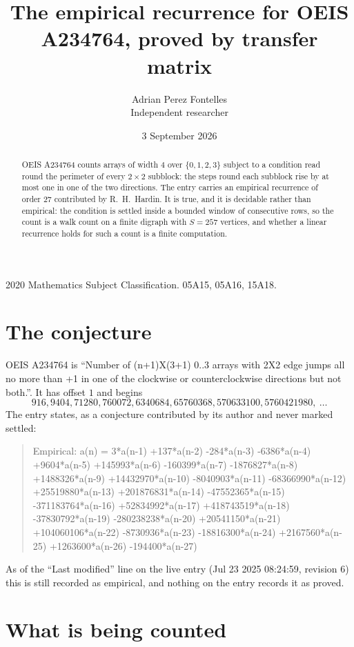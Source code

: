 \documentclass[11pt,a4paper]{article}
\title{The empirical recurrence for OEIS A234764, proved by transfer matrix}
\author{Adrian Perez Fontelles\\ \small Independent researcher}
\date{3 September 2026}
\theoremstyle{plain}
\theoremstyle{definition}
\begin{document}
\maketitle

\begin{abstract}
OEIS A234764 counts arrays of width $4$ over $\{0,1,2,3\}$ subject to a condition read round the
perimeter of every $2\times2$ subblock: the steps round each subblock rise by at most one in one of the two directions. The entry carries an empirical recurrence of
order $27$ contributed by R.~H.~Hardin. It is true, and it is decidable rather than
empirical: the condition is settled inside a bounded window of consecutive rows, so the
count is a walk count on a finite digraph with $S=257$ vertices, and whether a linear
recurrence holds for such a count is a finite computation.
\end{abstract}

\noindent\small 2020 Mathematics Subject Classification. 05A15, 05A16, 15A18.\normalsize

\section{The conjecture}

OEIS A234764 is ``Number of (n+1)X(3+1) 0..3 arrays with 2X2 edge jumps all no more than +1 in one of the clockwise or counterclockwise directions but not both.''. It has offset $1$ and begins
\[
916, 9404, 71280, 760072, 6340684, 65760368, 570633100, 5760421980,\ \dots
\]
The entry states, as a conjecture contributed by its author and never marked settled:
\begin{quote}
Empirical: a(n) = 3*a(n-1) +137*a(n-2) -284*a(n-3) -6386*a(n-4) +9604*a(n-5) +145993*a(n-6) -160399*a(n-7) -1876827*a(n-8) +1488326*a(n-9) +14432970*a(n-10) -8040903*a(n-11) -68366990*a(n-12) +25519880*a(n-13) +201876831*a(n-14) -47552365*a(n-15) -371183764*a(n-16) +52834992*a(n-17) +418743519*a(n-18) -37830792*a(n-19) -280238238*a(n-20) +20541150*a(n-21) +104060106*a(n-22) -8730936*a(n-23) -18816300*a(n-24) +2167560*a(n-25) +1263600*a(n-26) -194400*a(n-27)
\end{quote}
As of the ``Last modified'' line on the live entry (Jul 23 2025 08:24:59, revision 6) this is still
recorded as empirical, and nothing on the entry records it as proved.

\section{What is being counted}
\end{document}
